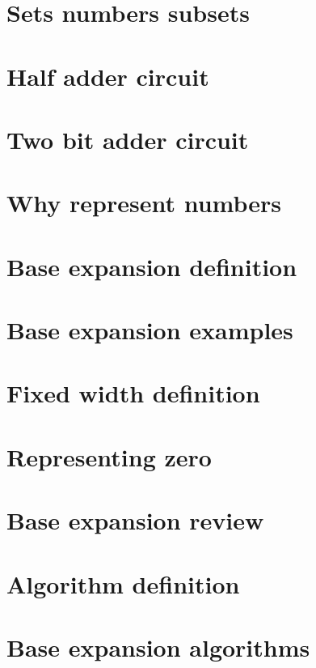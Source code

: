 
\section*{Sets numbers subsets}

\vfill
\section*{Half adder circuit}

\vfill
\section*{Two bit adder circuit}

\vfill
\section*{Why represent numbers}

\vfill
\section*{Base expansion definition}

\vfill
\section*{Base expansion examples}

\vfill
\section*{Fixed width definition}

\vfill
\section*{Representing zero}

\vfill
\section*{Base expansion review}

\vfill
\section*{Algorithm definition}

\vfill
\section*{Base expansion algorithms}

\vfill
